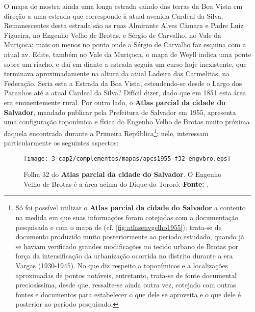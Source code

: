 \begin{citacao}
O mapa de  mostra ainda uma longa estrada saindo das terras da Boa Vista em direção a uma estrada que corresponde à atual avenida Cardeal da Silva. Remanescentes desta estrada são as ruas Almirante Alves Câmara e Padre Luiz Figueira, no Engenho Velho de Brotas, e Sérgio de Carvalho, no Vale da Muriçoca; mais ou menos no ponto onde a Sérgio de Carvalho faz esquina com a atual av. Edite, também no Vale da Muriçoca, o mapa de Weyll indica uma ponte sobre um riacho, e daí em diante a estrada seguia um curso hoje inexistente, que terminava aproximadamente na altura da atual Ladeira das Carmelitas, na Federação. Seria esta a Estrada da Boa Vista, estendendo-se desde o Largo dos Paranhos até a atual Cardeal da Silva? Difícil dizer, dado que em 1851 esta área era eminentemente rural. Por outro lado, o \textbf{Atlas parcial da cidade do Salvador}, mandado publicar pela Prefeitura de Salvador em 1955, apresenta uma configuração toponímica e física do Engenho Velho de Brotas muito próxima daquela encontrada durante a Primeira República\footnote{Só foi possível utilizar o \textbf{Atlas parcial da cidade do Salvador} a contento na medida em que suas informações foram cotejadas com a documentação pesquisada e com o mapa de  (cf. \autoref{fig:atlasenvgelho1955}); trata-se de documento produzido muito posteriormente ao período estudado, quando já se haviam verificado grandes modificações no tecido urbano de Brotas por força da intensificação da urbanização ocorrida no distrito durante a era Vargas (1930-1945). No que diz respeito a toponímicos e a localizações aproximadas de pontos notáveis, entretanto, trata-se de fonte documental preciosíssima, desde que, ressalte-se ainda outra vez, cotejado com outras fontes e documentos para estabelecer o que dele se aproveita e o que dele é posterior ao período pesquisado.}; nele, interessam particularmente os seguintes aspectos:

\begin{figure}[!htp]
\centering
\texttt{[image: 3-cap2/complementos/mapas/apcs1955-f32-engvbro.eps]} 
\caption{Folha 32 do \textbf{Atlas parcial da cidade do Salvador}. O Engenho Velho de Brotas é a área acima do Dique do Tororó. \textbf{Fonte:} .}
\label{fig:atlasenvgelho1955}
\end{figure}


\end{citacao}
